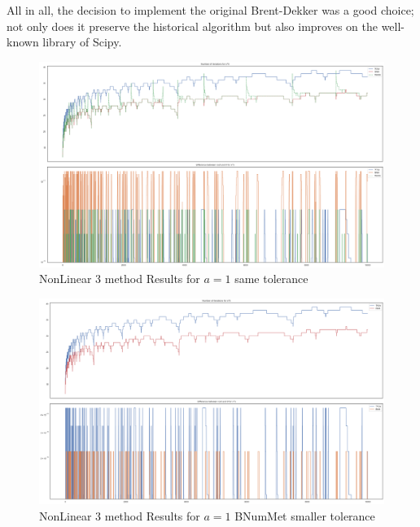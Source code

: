 All in all, the decision to implement the original Brent-Dekker was a good choice; not only does it preserve the historical algorithm but also improves on the well-known library of Scipy.

\begin{figure}
    \centering
    \includegraphics[width=\textwidth]{Include/Images/Thesis/Analysis of Solutions/NonLinear AS/NonLinear 3 method Results a-1.png}
    \caption{NonLinear 3 method Results for $a=1$ same tolerance}
    \label{fig:NonLinear 3 method Results for a=1 same tolerance}
\end{figure}

\begin{figure}
    \centering
    \includegraphics[width=\textwidth]{Include/Images/Thesis/Analysis of Solutions/NonLinear AS/NonLinear 3 method Results Small Tol Bnum a-1.png}
    \caption{NonLinear 3 method Results for $a=1$ BNumMet smaller tolerance}
    \label{fig:NonLinear 3 method Results for a=1 BNumMet smaller tolerance}
\end{figure}

